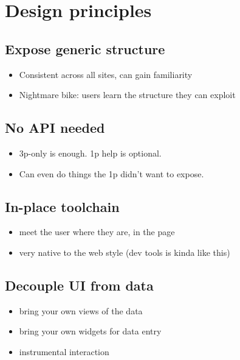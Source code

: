 \documentclass[english,submission]{programming}
\providecommand{\tightlist}{%
  \setlength{\itemsep}{0pt}\setlength{\parskip}{0pt}}
\begin{document}
\hypertarget{design-principles}{%
\section{Design principles}\label{design-principles}}

\hypertarget{expose-generic-structure}{%
\subsection{Expose generic structure}\label{expose-generic-structure}}

\begin{itemize}
\tightlist
\item
  Consistent across all sites, can gain familiarity
\item
  Nightmare bike: users learn the structure they can exploit
\end{itemize}

\hypertarget{no-api-needed}{%
\subsection{No API needed}\label{no-api-needed}}

\begin{itemize}
\tightlist
\item
  3p-only is enough. 1p help is optional.
\item
  Can even do things the 1p didn't want to expose.
\end{itemize}

\hypertarget{in-place-toolchain}{%
\subsection{In-place toolchain}\label{in-place-toolchain}}

\begin{itemize}
\tightlist
\item
  meet the user where they are, in the page
\item
  very native to the web style (dev tools is kinda like this)
\end{itemize}

\hypertarget{decouple-ui-from-data}{%
\subsection{Decouple UI from data}\label{decouple-ui-from-data}}

\begin{itemize}
\tightlist
\item
  bring your own views of the data
\item
  bring your own widgets for data entry
\item
  instrumental interaction
\end{itemize}
\end{document}

